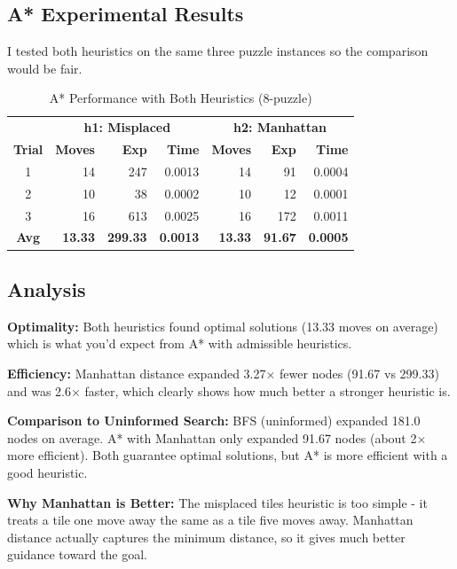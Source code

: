 \documentclass[letterpaper]{article}
\begin{document}
\subsection{A* Experimental Results}

I tested both heuristics on the same three puzzle instances so the comparison would be fair.

\begin{table}[h]
\centering
\tiny
\begin{tabular}{crrr|rrr}
\toprule
& \multicolumn{3}{c}{\textbf{h1: Misplaced}} & \multicolumn{3}{c}{\textbf{h2: Manhattan}} \\
\cmidrule(lr){2-4} \cmidrule(lr){5-7}
\textbf{Trial} & \textbf{Moves} & \textbf{Exp} & \textbf{Time} & \textbf{Moves} & \textbf{Exp} & \textbf{Time} \\
\midrule
1 & 14 & 247 & 0.0013 & 14 & 91 & 0.0004 \\
2 & 10 & 38 & 0.0002 & 10 & 12 & 0.0001 \\
3 & 16 & 613 & 0.0025 & 16 & 172 & 0.0011 \\
\midrule
\textbf{Avg} & \textbf{13.33} & \textbf{299.33} & \textbf{0.0013} & \textbf{13.33} & \textbf{91.67} & \textbf{0.0005} \\
\bottomrule
\end{tabular}
\caption{A* Performance with Both Heuristics (8-puzzle)}
\end{table}

\subsection{Analysis}

\textbf{Optimality:} Both heuristics found optimal solutions (13.33 moves on average) which is what you'd expect from A* with admissible heuristics.

\textbf{Efficiency:} Manhattan distance expanded 3.27× fewer nodes (91.67 vs 299.33) and was 2.6× faster, which clearly shows how much better a stronger heuristic is.

\textbf{Comparison to Uninformed Search:} BFS (uninformed) expanded 181.0 nodes on average. A* with Manhattan only expanded 91.67 nodes (about 2× more efficient). Both guarantee optimal solutions, but A* is more efficient with a good heuristic.

\textbf{Why Manhattan is Better:} The misplaced tiles heuristic is too simple - it treats a tile one move away the same as a tile five moves away. Manhattan distance actually captures the minimum distance, so it gives much better guidance toward the goal.
\end{document}
